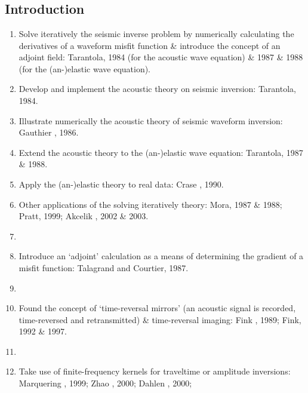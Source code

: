 \renewcommand{\pmk}{Tromp\_2005\_GJI\_Adjoint methods}
\renewcommand{\prf}{FWI/\pmk.pdf}
\renewcommand{\pti}{Seismic tomography, adjoint methods, time reversal and banana-doughnut kernels}
\renewcommand{\pay}{Jeroen Tromp, Carl Tape and Qinya Liu, 2005}
\renewcommand{\pjo}{Geophys. J. Int.}
\renewcommand{\pda}{2016/10/17 Mon.}

\section{\pinfo}
\subsection{Introduction}
\begin{enumerate}[\hspace{10mm}*]
  \item Solve iteratively the seismic inverse problem
    by numerically calculating the \Frechet derivatives of a waveform misfit function
    \& introduce the concept of an adjoint field:
    Tarantola, 1984 (for the acoustic wave equation)
    \& 1987 \& 1988 (for the (an-)elastic wave equation).
  \item Develop and implement the acoustic theory on seismic inversion: Tarantola, 1984.
  \item Illustrate numerically the acoustic theory of seismic waveform inversion:
    Gauthier \etal, 1986.
  \item Extend the acoustic theory to the (an-)elastic wave equation: Tarantola, 1987 \& 1988.
  \item Apply the (an-)elastic theory to real data: Crase \etal, 1990.
  \item Other applications of the solving iteratively theory:
    Mora, 1987 \& 1988; Pratt, 1999; Akcelik \etal, 2002 \& 2003.
  \item \sline
  \item Introduce an `adjoint' calculation as a means of determining the gradient
    of a misfit function: Talagrand and Courtier, 1987.
  \item \sline
  \item Found the concept of `time-reversal mirrors'
    (an acoustic signal is recorded, time-reversed and retransmitted)
    \& time-reversal imaging:
    Fink \etal, 1989; Fink, 1992 \& 1997.
  \item \sline
  \item Take use of finite-frequency kernels for traveltime or amplitude inversions:
    Marquering \etal, 1999; Zhao \etal, 2000; Dahlen \etal, 2000;

\end{enumerate}
